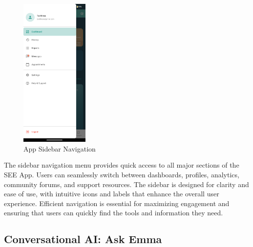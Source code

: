 ﻿\documentclass[12pt,a4paper]{article}
\newcommand{\sectiontitle}[1]{\subsection{#1}}
\begin{document}
\begin{figure}[H]
    \centering
    \includegraphics[width=0.3\textwidth]{Screenshots/sidebar.png}
    \caption{App Sidebar Navigation}
    \label{fig:sidebar}
\end{figure}
The sidebar navigation menu provides quick access to all major sections of the SEE App. Users can seamlessly switch between dashboards, profiles, analytics, community forums, and support resources. The sidebar is designed for clarity and ease of use, with intuitive icons and labels that enhance the overall user experience. Efficient navigation is essential for maximizing engagement and ensuring that users can quickly find the tools and information they need.

\sectiontitle{Conversational AI: Ask Emma}
\end{document}
